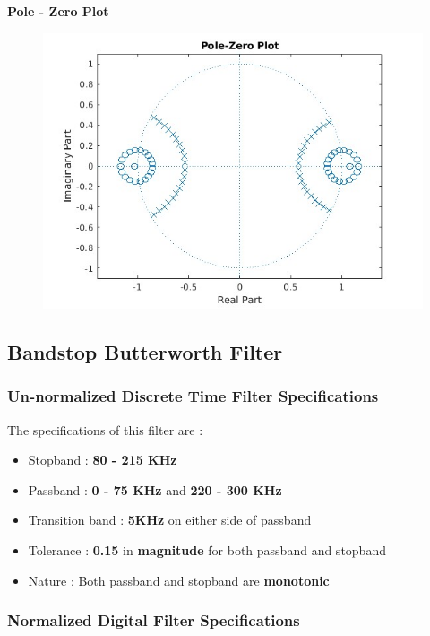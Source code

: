 \documentclass{article}
\begin{document}
\textbf{Pole - Zero Plot}
\begin{figure}[H]
\hspace*{-2.5cm}
    \centering
    \includegraphics[scale = 0.5]{pole_zeroplot_bpf.jpg}
    \label{fig:my_label}
\end{figure}

\subsection{\textbf{Bandstop Butterworth Filter}}
\subsubsection{\textbf{Un-normalized Discrete Time Filter Specifications}}

\noindent
The specifications of this filter are :
\begin{itemize}
    \item Stopband : \textbf{80 - 215 KHz}
    \item Passband : \textbf{0 - 75 KHz} and \textbf{220 - 300 KHz}
    \item  Transition band : \textbf{5KHz} on either side of passband
    \item  Tolerance : \textbf{0.15} in \textbf{magnitude} for both passband and stopband
    \item  Nature : Both passband and stopband are \textbf{monotonic}
\end{itemize}

\subsubsection{Normalized Digital Filter Specifications}
\end{document}
